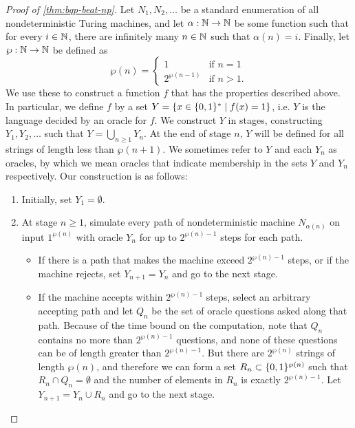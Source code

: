 \documentclass[12pt]{article}
\begin{document}
\begin{mdframed}
\begin{proof}[Proof of \cref{thm:bqp-beat-np}]
  Let $N_1, N_2, \dots$ be a standard enumeration of all nondeterministic Turing
  machines, and let $\alpha : \NN \to \NN$ be some function such that for every
  $i \in \NN$, there are infinitely many $n \in \NN$ such that $\alpha(n) = i$.
  Finally, let $\wp : \NN \to \NN$ be defined as
  $$
    \wp(n) = \begin{cases}
              1            & \text{if $n=1$} \\
              2^{\wp(n-1)} & \text{if $n>1$}.
             \end{cases}
  $$
  We use these to construct a function $f$ that has the properties described
  above. In particular, we define $f$ by a set $Y = \curl*{x\in \zo^* \mid
  f(x)=1}$, i.e. $Y$ is the language decided by an oracle for $f$. We construct
  $Y$ in stages, constructing $Y_1, Y_2, \dots$ such that $Y = \bigcup_{n\ge 1}
  Y_n$. At the end of stage $n$, $Y$ will be defined for all strings of length
  less than $\wp(n+1)$. We sometimes refer to $Y$ and each $Y_n$ as oracles, by
  which we mean oracles that indicate membership in the sets $Y$ and $Y_n$
  respectively. 
  Our construction is as follows:
  \begin{enumerate}
    \item Initially, set $Y_1=\emptyset$.
    \item At stage $n \ge 1$, simulate every path of nondeterministic machine
      $N_{\alpha(n)}$ on input $1^{\wp(n)}$ with oracle $Y_n$ for up to
      $2^{\wp(n)-1}$ steps for each path.
      \begin{itemize}
        \item If there is a path that makes the machine exceed $2^{\wp(n)-1}$
          steps, or if the machine rejects, set $Y_{n+1}=Y_n$ and go to the next
          stage.
        \item If the machine accepts within $2^{\wp(n)-1}$ steps, select an
          arbitrary accepting path and let $Q_n$ be the set of oracle questions
          asked along that path. Because of the time bound on the computation,
          note that $Q_n$ contains no more than $2^{\wp(n)-1}$ questions, and
          none of these questions can be of length greater than $2^{\wp(n)-1}$.
          But there are $2^{\wp(n)}$ strings of length $\wp(n)$, and therefore
          we can form a set $R_n \subset \zo^{\wp(n)}$ such that $R_n \cap
          Q_n = \emptyset$ and the number of elements in $R_n$ is exactly
          $2^{\wp(n)-1}$. Let $Y_{n+1} = Y_n \cup R_n$ and go to the next stage.
      \end{itemize}
  \end{enumerate}
\end{proof}
\end{mdframed}


\nocite{*}


\end{document}
